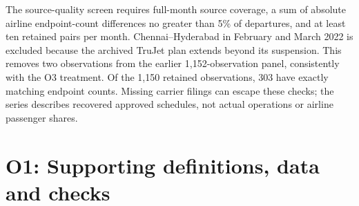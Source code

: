 The source-quality screen requires full-month source coverage, a sum of absolute airline endpoint-count differences no greater than 5\% of departures, and at least ten retained pairs per month. Chennai--Hyderabad in February and March 2022 is excluded because the archived TruJet plan extends beyond its suspension. This removes two observations from the earlier 1,152-observation panel, consistently with the O3 treatment. Of the 1,150 retained observations, 303 have exactly matching endpoint counts. Missing carrier filings can escape these checks; the series describes recovered approved schedules, not actual operations or airline passenger shares.


\clearpage
\section{O1: Supporting definitions, data and checks}
\label{app:o1-additional}
